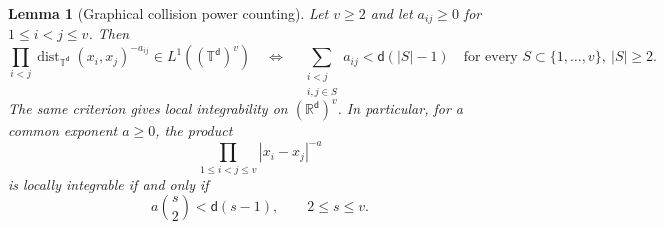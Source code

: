 \documentclass[11pt,reqno]{amsart}
\numberwithin{equation}{section}
\theoremstyle{plain}
\newtheorem{lemma}[lemma]{Lemma}
\theoremstyle{definition}
\renewcommand{\d}{\mathsf d}
\newcommand{\T}{\mathbb T}
\newcommand{\R}{\mathbb R}
\begin{document}
\begin{lemma}[Graphical collision power counting]
\label{lem:nested-cluster-power-count}
Let $v\geq2$ and let $a_{ij}\geq0$ for $1\leq i<j\leq v$. Then
\begin{equation}
 \prod_{i<j}\operatorname{dist}_{\T^\d}(x_i,x_j)^{-a_{ij}}
 \in L^1((\T^\d)^v)
 \quad\Longleftrightarrow\quad
 \sum_{\substack{i<j\\ i,j\in S}}a_{ij}<\d(|S|-1)
 \quad\text{for every }S\subset\{1,\ldots,v\},\ |S|\geq2.
 \label{eq:graph-collision-criterion}
\end{equation}
The same criterion gives local integrability on $(\R^\d)^v$. In particular, for a common exponent $a\geq0$, the product
\begin{equation}
 \prod_{1\leq i<j\leq v}|x_i-x_j|^{-a}
 \label{eq:euclidean-collision-product}
\end{equation}
is locally integrable if and only if
\begin{equation}
 a\binom{s}{2}<\d(s-1),\qquad 2\leq s\leq v.
 \label{eq:cluster-integrability-criterion}
\end{equation}
\end{lemma}
\end{document}
